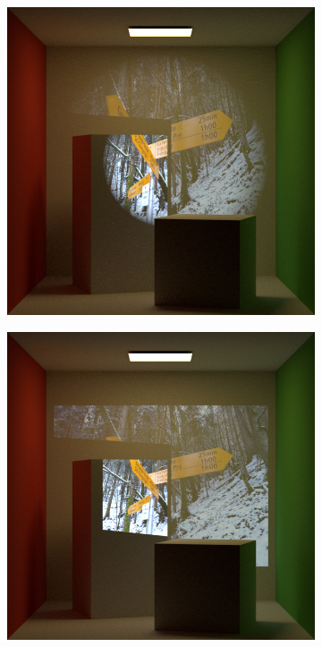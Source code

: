 \begin{figure}[]
    \centering
    \begin{subfigure}[b]{0.32\textwidth}
        \centering
        \includegraphics[width=\textwidth]{images/03-projector_features-spotlight.jpg}
        \caption{}
        \label{fig:methods_projector_features_spotlight}
    \end{subfigure}
    \hfill
    \begin{subfigure}[b]{0.32\textwidth}
        \centering
        \includegraphics[width=\textwidth]{images/03-projector_features-frustum.jpg}

\end{subfigure}
\end{figure}
